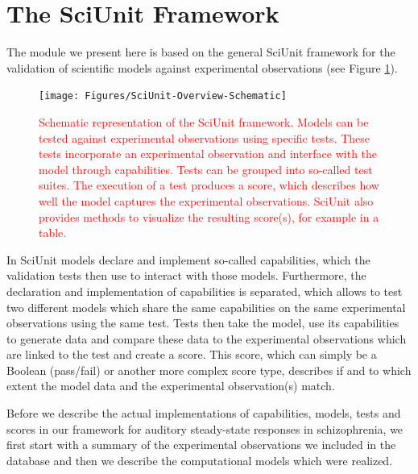 \documentclass[a4paper,10pt]{article}
\begin{document}

\section{The SciUnit Framework}
The module we present here is based on the general SciUnit framework for the validation of scientific models against 
experimental observations \cite{Omar2014} (see Figure \ref{Fig:SciUnit-Scheme}).

\begin{figure}
\texttt{[image: Figures/SciUnit-Overview-Schematic]}
\caption{\textcolor{red}{Schematic representation of the SciUnit framework. Models can be tested against experimental observations using specific tests. 
These tests incorporate an experimental observation and interface with the model through capabilities. Tests can be grouped into so-called test suites. The execution of a test 
produces a score, which describes how well the model captures the experimental observations. SciUnit also provides methods to visualize the resulting score(s), for example in a table.}}
\label{Fig:SciUnit-Scheme}
\end{figure}

In SciUnit models declare and implement so-called capabilities, which the validation tests then use to 
interact with those models. Furthermore, the declaration
and implementation of capabilities is separated, which allows to test two different models which share the 
same capabilities on the same experimental observations using
the same test. Tests then take the model, use its capabilities to generate data and compare these data to the 
experimental observations which are linked to the test
and create a score. This score, which can simply be a Boolean (pass/fail) or another more complex score type, 
describes if and to which extent the model data and the experimental observation(s) match.

Before we describe the actual implementations of capabilities, models, tests and scores in our framework for 
auditory steady-state responses in schizophrenia,
we first start with a summary of the experimental observations we included in the database and 
then we describe the computational models which were realized.
\end{document}
